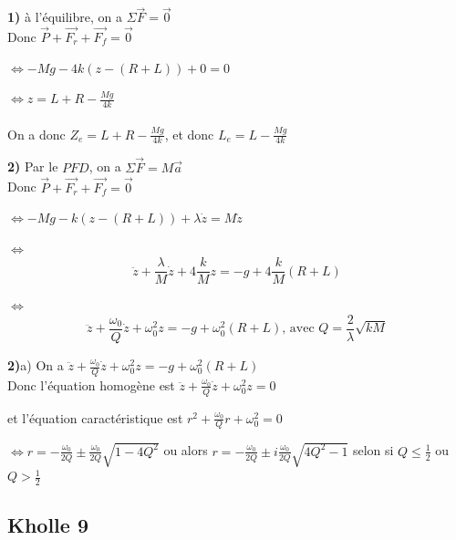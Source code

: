 \documentclass{article}
\begin{document}
\textbf{1)} \hspace{0.2cm} à l'équilibre, on a $\Sigma \overrightarrow{F} = \overrightarrow{0}$ \\

Donc $\overrightarrow{P} + \overrightarrow{F_r} + \overrightarrow{F_f} = \overrightarrow{0}$

\hspace{0.3cm} $\Leftrightarrow -Mg - 4k(z - (R+L)) + 0 = 0$

\hspace{0.3cm} $\Leftrightarrow z = L + R - \frac{Mg}{4k}$ \\ \\
On a donc $Z_e = L + R - \frac{Mg}{4k}$, et donc $L_e = L - \frac{Mg}{4k}$


\textbf{2)} \hspace{0.2cm} Par le $PFD$, on a $\Sigma \overrightarrow{F} = M\overrightarrow{a}$ \\

Donc $\overrightarrow{P} + \overrightarrow{F_r} + \overrightarrow{F_f} = \overrightarrow{0}$

\hspace{0.3cm} $\Leftrightarrow -Mg - k(z - (R+L)) + \lambda \dot{z} = M \ddot{z}$

\hspace{0.3cm} $\Leftrightarrow$ $$\ddot{z} + \frac{\lambda}{M} \dot{z} + 4 \frac{k}{M} z = -g + 4 \frac{k}{M}(R+L)$$

\hspace{0.3cm} $\Leftrightarrow$ $$\ddot{z} + \frac{\omega_0}{Q} \dot{z} + \omega^2_0 z = -g + \omega^2_0 (R+L) \text{, avec } Q = \frac2\lambda \sqrt{kM}$$

\textbf{2)}a) \hspace{0.2cm} On a $\ddot{z} + \frac{\omega_0}{Q} \dot{z} + \omega^2_0 z = -g + \omega^2_0 (R+L)$ \\

Donc l'équation homogène est $\ddot{z} + \frac{\omega_0}{Q} \dot{z} + \omega^2_0 z = 0$

et l'équation caractéristique est $r^2 + \frac{\omega_0}{Q} r + \omega^2_0 = 0$

\hspace{1cm} $\Leftrightarrow r = - \frac{\omega_0}{2Q} \pm \frac{\omega_0}{2Q} \sqrt{1-4Q^2}$ ou alors $r = - \frac{\omega_0}{2Q} \pm i \frac{\omega_0}{2Q} \sqrt{4Q^2 - 1}$ selon si $Q \leqslant \frac12$ ou $Q > \frac12$



\subsection{Kholle 9}
\end{document}
